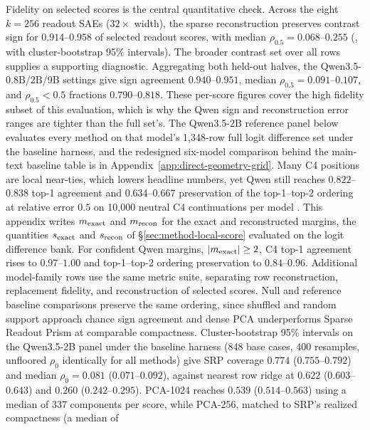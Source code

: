 Fidelity on selected scores is the central quantitative check. Across the
eight \(k=256\) readout SAEs (\(32\times\) width), the sparse
reconstruction preserves contrast sign for \(0.914\)--\(0.958\) of
selected readout scores, with median \(\rho_{0.5}=0.068\)--\(0.255\)
(, with cluster-bootstrap 95\% intervals).
The broader contrast
set over all rows supplies a supporting diagnostic. Aggregating both held-out
halves, the Qwen3.5-0.8B/2B/9B settings give sign agreement
\(0.940\)--\(0.951\), median \(\rho_{0.5}=0.091\)--\(0.107\), and \(\rho_{0.5}<0.5\)
fractions \(0.790\)--\(0.818\). These per-score figures cover the
high fidelity subset of this evaluation, which is why the
Qwen sign and reconstruction error ranges are tighter than the full
set's. The Qwen3.5-2B reference panel below
evaluates every method on that model's 1{,}348-row full logit difference
set under the baseline harness, and the redesigned six-model
comparison behind the main-text baseline table is in
Appendix~\ref{app:direct-geometry-grid}. Many C4 positions are
local near-ties, which lowers headline numbers, yet Qwen still reaches
\(0.822\)--\(0.838\) top-1 agreement and \(0.634\)--\(0.667\)
preservation of the top-1--top-2 ordering at relative error \(0.5\) on 10{,}000
neutral C4 continuations per model
\citep{raffel2020exploring,dodge2021documenting}. This appendix writes \(m_{\mathrm{exact}}\) and \(m_{\mathrm{recon}}\) for the exact and
reconstructed margins, the quantities \(s_{\mathrm{exact}}\) and \(s_{\mathrm{recon}}\) of
\S\ref{sec:method-local-score} evaluated on the logit difference bank.
For confident Qwen margins,
\(|m_{\mathrm{exact}}|\ge2\), C4 top-1 agreement rises to \(0.97\)--\(1.00\)
and top-1--top-2 ordering preservation to \(0.84\)--\(0.96\). Additional
model-family rows use the same metric suite, separating row reconstruction,
replacement fidelity, and reconstruction of selected scores. Null and reference
baseline comparisons preserve the same ordering, since shuffled and random support
approach chance sign agreement and dense PCA underperforms Sparse Readout Prism
at comparable compactness. Cluster-bootstrap 95\% intervals on the Qwen3.5-2B panel under the baseline harness
(848 base cases, 400 resamples, unfloored \(\rho_0\) identically for all
methods) give SRP coverage
\(0.774\) (\(0.755\)--\(0.792\)) and median \(\rho_0=0.081\)
(\(0.071\)--\(0.092\)), against nearest row ridge at \(0.622\)
(\(0.603\)--\(0.643\)) and \(0.260\) (\(0.242\)--\(0.295\)). PCA-1024
reaches \(0.539\) (\(0.514\)--\(0.563\)) using a median of 337 components
per score, while PCA-256, matched to SRP's realized compactness (a median of
